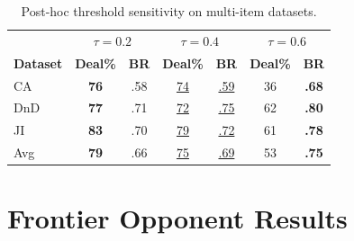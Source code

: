 \documentclass[11pt]{article}
\newcommand{\lightrule}{\arrayrulecolor{black!20}\midrule\arrayrulecolor{black}}
\begin{document}
\begin{table}[ht]
\centering
\scriptsize
\setlength{\tabcolsep}{4pt}
\renewcommand{\arraystretch}{1.15}
\begin{tabular}{l cc cc cc}
\toprule
\rowcolor{tableheader}
& \multicolumn{2}{c}{$\tau{=}0.2$} & \multicolumn{2}{c}{$\tau{=}0.4$} & \multicolumn{2}{c}{$\tau{=}0.6$} \\
\rowcolor{tableheader}
\textbf{Dataset} & \textbf{Deal\%} & \textbf{BR} & \textbf{Deal\%} & \textbf{BR} & \textbf{Deal\%} & \textbf{BR} \\
\midrule
\rowcolor{tablerow}
CA   & \textbf{76} & .58 & \underline{74} & \underline{.59} & 36 & \textbf{.68} \\
DnD  & \textbf{77} & .71 & \underline{72} & \underline{.75} & 62 & \textbf{.80} \\
\rowcolor{tablerow}
JI   & \textbf{83} & .70 & \underline{79} & \underline{.72} & 61 & \textbf{.78} \\
\lightrule
\rowcolor{tablerow}
Avg  & \textbf{79} & .66 & \underline{75} & \underline{.69} & 53 & \textbf{.75} \\
\bottomrule
\end{tabular}
\caption{Post-hoc threshold sensitivity on multi-item datasets.}
\label{tab:tau_ablation}
\end{table}

\section{Frontier Opponent Results}
\label{app:frontier}
\end{document}
